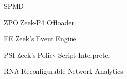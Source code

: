 
\begin{listofabbrv}{SPMD}
    \item[ZPO] Zeek-P4 Offloader
    \item[EE]  Zeek's Event Engine
    \item[PSI] Zeek's Policy Script Interpreter
    \item[RNA] Reconfigurable Network Analytics
\end{listofabbrv}
